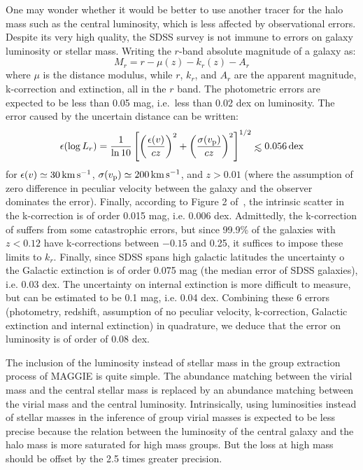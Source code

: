 One may wonder whether it would be better to  use another tracer for the halo
mass such as the central luminosity, which is less affected by observational
errors. Despite its very high quality, the SDSS survey is not immune to errors
on galaxy luminosity or stellar mass. Writing the $r$-band absolute magnitude
of a galaxy as:
%
\begin{equation}
    M_r = r - \mu(z) - k_r(z) - A_r
\end{equation}
%
where $\mu$ is the distance modulus, while $r$, $k_r$, and $A_r$ are the
apparent magnitude, k-correction and extinction, all in the $r$ band. The
photometric errors are expected to be less than 0.05 mag, i.e.\ less than 0.02
dex on luminosity.  The error caused by the uncertain distance can be written:
%
\begin{equation}
    \epsilon(\log L_r) = {1\over \ln 10}\,{\left[{\left({\epsilon(v)\over c
            z}\right)}^2+
    {\left({\sigma(v_{\rm p})\over cz}\right)}^2\right]}^{1/2} \la 0.056\,\rm dex
\end{equation}
%
for $\epsilon(v)\simeq 30 \, \rm km \, s^{-1}$, $\sigma(v_{\rm p}) \simeq 200
\, \rm km \, s^{-1}$, and $z>0.01$ (where the assumption of zero difference in
peculiar velocity between the galaxy and the observer dominates the error).
Finally, according to Figure 2 of~\cite{Chilingarian+10}, the intrinsic scatter
in the k-correction is of order 0.015 mag, i.e. 0.006 dex. Admittedly, the
k-correction of \citeauthor{Chilingarian+10} suffers from some catastrophic
errors, but since 99.9\% of the galaxies with $z < 0.12$ have k-corrections
between $-0.15$ and 0.25, it suffices to impose these limits to $k_r$. Finally,
since SDSS spans high galactic latitudes the uncertainty o the Galactic
extinction is of order 0.075 mag (the median error of SDSS galaxies), i.e. 0.03
dex. The uncertainty on internal extinction is more difficult to measure, but
can be estimated to be 0.1 mag, i.e. 0.04 dex. Combining these 6 errors
(photometry, redshift, assumption of no peculiar velocity, k-correction,
Galactic extinction and internal extinction) in quadrature, we deduce that the
error on luminosity is of order of 0.08 dex.

The inclusion of the luminosity instead of stellar mass in the group extraction
process of MAGGIE is quite simple. The abundance matching between the virial
mass and the central stellar mass is replaced by an abundance matching between
the virial mass and the central luminosity. Intrinsically, using luminosities
instead of stellar masses in the inference of group virial masses is expected
to be less precise because the relation between the luminosity of the central
galaxy and the halo mass is more saturated for high mass groups. But the loss
at high mass should be offset by the 2.5 times greater precision.

